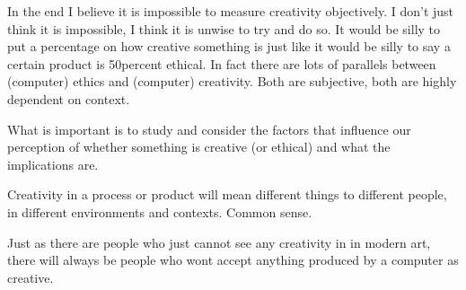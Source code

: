 \begin{draft}
  In the end I believe it is impossible to measure creativity objectively. I don’t just think it is impossible, I think it is unwise to try and do so. It would be silly to put a percentage on how creative something is just like it would be silly to say a certain product is 50percent ethical. In fact there are lots of parallels between (computer) ethics and (computer) creativity. Both are subjective, both are highly dependent on context.

  What is important is to study and consider the factors that influence our perception of whether something is creative (or ethical) and what the implications are.

  Creativity in a process or product will mean different things to different people, in different environments and contexts.
  Common sense.

  Just as there are people who just cannot see any creativity in in modern art, there will always be people who wont accept anything produced by a computer as creative.
\end{draft}



